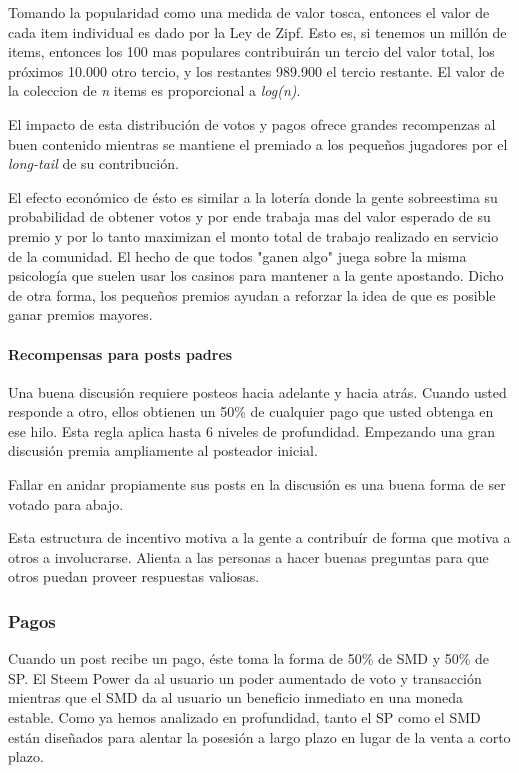 \documentclass[a4paper,titlepage,final]{article}
\begin{document}
Tomando la popularidad como una medida de valor tosca, entonces el valor de cada item individual es dado por la Ley de Zipf. Esto es, si tenemos un millón de items, entonces los 100 mas populares contribuirán un tercio del valor total, los próximos 10.000 otro tercio, y los restantes 989.900 el tercio restante. El valor de la coleccion de \textit{n} items es proporcional a \textit{log(n)}.

El impacto de esta distribución de votos y pagos ofrece grandes recompenzas al buen contenido mientras se mantiene el premiado a los pequeños jugadores por el \textit{long-tail} de su contribución.

El efecto económico de ésto es similar a la lotería donde la gente sobreestima su probabilidad de obtener votos y por ende trabaja mas del valor esperado de su premio y por lo tanto maximizan el monto total de trabajo realizado en servicio de la comunidad. El hecho de que todos "ganen algo" juega sobre la misma psicología que suelen usar los casinos para mantener a la gente apostando. Dicho de otra forma, los pequeños premios ayudan a reforzar la idea de que es posible ganar premios mayores.

\paragraph{Recompensas para posts padres}

Una buena discusión requiere posteos hacia adelante y hacia atrás. Cuando usted responde a otro, ellos obtienen un 50\% de cualquier pago que usted obtenga en ese hilo. Esta regla aplica hasta 6 niveles de profundidad. Empezando una gran discusión premia ampliamente al posteador inicial.

Fallar en anidar propiamente sus posts en la discusión es una buena forma de ser votado para abajo.

Esta estructura de incentivo motiva a la gente a contribuír de forma que motiva a otros a involucrarse. Alienta a las personas a hacer buenas preguntas para que otros puedan proveer respuestas valiosas.

\subsubsection{Pagos}

Cuando un post recibe un pago, éste toma la forma de 50\% de SMD y 50\% de SP. El Steem Power da al usuario un poder aumentado de voto y transacción mientras que el SMD da al usuario un beneficio inmediato en una moneda estable. Como ya hemos analizado en profundidad, tanto el SP como el SMD están diseñados para alentar la posesión a largo plazo en lugar de la venta a corto plazo.
\end{document}
